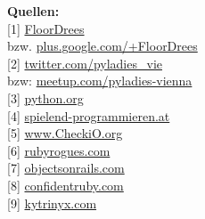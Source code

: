 \textbf{Quellen:} \\
{[}1{]} \href{https://twitter.com/FloorDrees}{FloorDrees} \\
bzw.    \href{https://plus.google.com/+FloorDrees/about}{plus.google.com/+FloorDrees} \\
{[}2{]} \href{https://twitter.com/pyladies_vie}{twitter.com/pyladies\_vie} \\
bzw: \href{http://www.meetup.com/pyladies-vienna}{meetup.com/pyladies-vienna} \\
{[}3{]} \href{http://python.org}{python.org} \\
{[}4{]} \href{http://spielend-programmieren.at}{spielend-programmieren.at} \\
{[}5{]} \href{http://www.checkio.org/}{www.CheckiO.org} \\
{[}6{]} \href{http://rubyrogues.com/}{rubyrogues.com} \\
{[}7{]} \href{http://objectsonrails.com/}{objectsonrails.com} \\
{[}8{]} \href{http://www.confidentruby.com/}{confidentruby.com} \\
{[}9{]} \href{http://kytrinyx.com/}{kytrinyx.com} 

